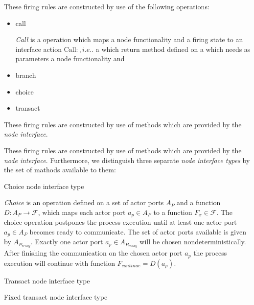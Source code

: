 These firing rules are constructed by use of the following operations:

\begin{itemize}
\item call

\emph{Call} is a operation which maps a node functionality and
a firing state to an interface action $\mathrm{Call}: , i.e. $. a which return method defined on a which needs as parameters
a node functionality and 

\item branch

\item choice

\item transact
\end{itemize}


These firing rules are constructed by use of methods
which are provided by the \emph{node interface}.

These firing rules are constructed by use of methods
which are provided by the \emph{node interface}.
Furthermore, we distinguish three separate \emph{node interface types}
by the set of mathods available to them:

\begin{definition}\label{choice-node-interface-type}
  Choice node interface type
  
  \emph{Choice} is an operation defined on a set of actor ports $A_{P}$
  and a function $D: A_{P} \to \mathcal{F}$, which maps each actor port
  $a_{p} \in A_{P}$ to a function $F_{x} \in \mathcal{F}$.
  The choice operation postpones the process execution 
  until at least one actor port $a_{p} \in A_{P}$
  becomes ready to communicate. The set of actor ports available
  is given by $A_{P_{ready}}$.
  Exactly one actor port $a_{p} \in A_{P_{ready}}$
  will be chosen nondeterministically. After
  finishing the communication on the chosen actor port $a_{p}$
  the process execution will continue
  with function $F_{continue} = D(a_{p})$.
\end{definition}

\begin{definition}\label{transact-node-interface-type}
  Transact node interface type
\end{definition}

\begin{definition}\label{fixed-transact-node-interface-type}
  Fixed transact node interface type
\end{definition}

